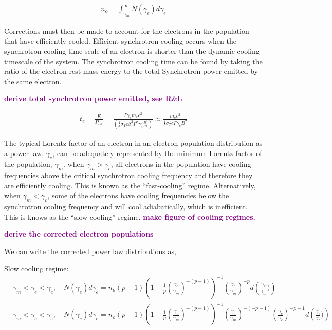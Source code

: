 \documentclass[linenumbers,twocolumn]{aastex631}
\newcommand{\mm}[1]{{\textcolor{purple}{\bf #1}}}
\begin{document}
\begin{appendix}
\begin{align}
	n_o = \int_{\gamma_m}^{\infty} N(\gamma_e) d\gamma_e
\end{align}

Corrections must then be made to account for the electrons in the population that have efficiently cooled. Efficient synchrotron cooling occurs when the synchrotron cooling time scale of an electron is shorter than the dynamic cooling timescale of the system. The synchrotron cooling time can be found by taking the ratio of the electron rest mass energy to the total Synchrotron power emitted by the same electron.

\mm{derive total synchrotron power emitted, see R$\&$L}

\begin{align}
	t_{c} = \frac{E}{P_{tot}} = \frac{\Gamma \gamma_e m_e c^2}{\left(\frac{4}{3} \sigma_T c \beta^2 \Gamma^2 \gamma_e^2 \frac{B^2}{8\pi}\right)} \approx \frac{m_e c^2}{\frac{4}{3}\sigma_T c \Gamma \gamma_e B^2}
\end{align} 

The typical Lorentz factor of an electron in an electron population distribution as a power law, $\gamma_e$, can be adequately represented by the minimum Lorentz factor of the population, $\gamma_m$. when $\gamma_m > \gamma_c$, all electrons in the population have cooling frequencies above the critical synchrotron cooling frequency and therefore they are efficiently cooling. This is known as the ``fast-cooling'' regime. Alternatively, when $\gamma_m < \gamma_c$, some of the electrons have cooling frequencies below the synchrotron cooling frequency and will cool adiabatically, which is inefficient. This is knows as the ``slow-cooling'' regime. \mm{make figure of cooling regimes.} 

\mm{derive the corrected electron populations}

We can write the corrected power law distributions as, 

Slow cooling regime:
\begin{align}
	&\gamma_m < \gamma_e < \gamma_c,\quad N(\gamma_e)d\gamma_e = n_o (p-1) \left(1 - \frac{1}{p} \left(\frac{\gamma_c}{\gamma_m}\right)^{-(p-1)}\right)^{-1} \left(\frac{\gamma_e}{\gamma_m}\right)^{-p} d\left(\frac{\gamma_e}{\gamma_m})\right)\\
	&\gamma_m < \gamma_c < \gamma_e,\quad N(\gamma_e)d\gamma_e = n_o (p-1) \left(1 - \frac{1}{p} \left(\frac{\gamma_c}{\gamma_m}\right)^{-(p-1)}\right)^{-1} \left(\frac{\gamma_c}{\gamma_m}\right)^{-(-p-1)}\left(\frac{\gamma_e}{\gamma_c}\right)^{-p-1} d\left(\frac{\gamma_e}{\gamma_c})\right)
\end{align}


\end{appendix}
\end{document}
